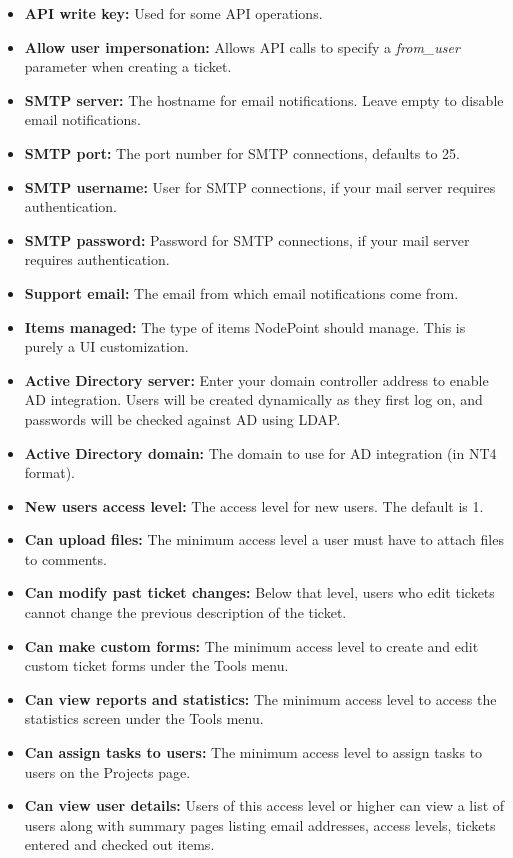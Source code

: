 \documentclass[11pt]{article}
\begin{document}
\begin{itemize}
\item \textbf{API write key:} Used for some API operations.
\item \textbf{Allow user impersonation:} Allows API calls to specify a \textit{from\_user} parameter when creating a ticket.
\item \textbf{SMTP server:} The hostname for email notifications. Leave empty to disable email notifications.
\item \textbf{SMTP port:} The port number for SMTP connections, defaults to 25.
\item \textbf{SMTP username:} User for SMTP connections, if your mail server requires authentication.
\item \textbf{SMTP password:} Password for SMTP connections, if your mail server requires authentication.
\item \textbf{Support email:} The email from which email notifications come from.
\item \textbf{Items managed:} The type of items NodePoint should manage. This is purely a UI customization.
\item \textbf{Active Directory server:} Enter your domain controller address to enable AD integration. Users will be created dynamically as they first log on, and passwords will be checked against AD using LDAP.
\item \textbf{Active Directory domain:} The domain to use for AD integration (in NT4 format).
\item \textbf{New users access level:} The access level for new users. The default is 1.
\item \textbf{Can upload files:} The minimum access level a user must have to attach files to comments.
\item \textbf{Can modify past ticket changes:} Below that level, users who edit tickets cannot change the previous description of the ticket.
\item \textbf{Can make custom forms:} The minimum access level to create and edit custom ticket forms under the Tools menu.
\item \textbf{Can view reports and statistics:} The minimum access level to access the statistics screen under the Tools menu.
\item \textbf{Can assign tasks to users:} The minimum access level to assign tasks to users on the Projects page.
\item \textbf{Can view user details:} Users of this access level or higher can view a list of users along with summary pages listing email addresses, access levels, tickets entered and checked out items.

\end{itemize}
\end{document}
